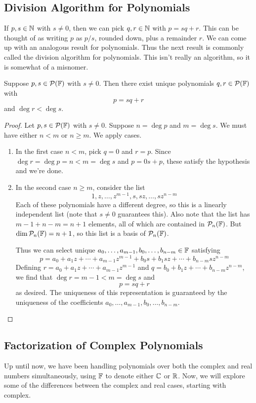 \subsection*{Division Algorithm for Polynomials}
If $p,s\in\mathbb{N}$ with $s\ne 0$, then we can pick $q,r\in\mathbb{N}$ with $p = sq + r$. This can be thought of as writing $p$ as $p/s$, rounded down, plus a remainder $r$. We can come up with an analogous result for polynomials. Thus the next result is commonly called the division algorithm for polynomials. This isn't really an algorithm, so it is somewhat of a misnomer.
\begin{theorem}
    Suppose $p,s\in \mathcal{P}(\mathbb F)$ with $s\ne 0$. Then there exist unique polynomials $q,r\in\mathcal{P}(\mathbb F)$ with
    \[ p = sq + r\]
    and $\deg r < \deg s$.
\end{theorem}
\begin{proof}
    Let $p,s\in\mathcal{P}(\mathbb F)$ with $s\ne 0$. Suppose $n = \deg p$ and $m = \deg s$. We must have either $n < m$ or $n \ge m$. We apply cases.
    \begin{enumerate}
        \item In the first case $n < m$, pick $q = 0$ and $r = p$. Since $\deg r = \deg p = n < m = \deg s$ and $p = 0s + p$, these satisfy the hypothesis and we're done.
        \item In the second case $n \ge m$, consider the list
        \[ 1, z, \dots, z^{m-1}, s, sz, \dots, sz^{n-m}\]
        Each of these polynomials have a different degree, so this is a linearly independent list (note that $s\ne 0$ guarantees this). Also note that the list has $m-1 + n-m = n+1$ elements, all of which are contained in $\mathcal{P}_n(\mathbb F)$. But $\dim \mathcal{P}_n(\mathbb F) = n+1$, so this list is a basis of $\mathcal{P}_n(\mathbb F)$.

        Thus we can select unique $a_0, \dots, a_{m-1}, b_0, \dots, b_{n-m}\in \mathbb F$ satisfying
        \[ p = a_0 + a_1z + \cdots + a_{m-1}z^{m-1} + b_0s + b_1sz + \cdots + b_{n-m}sz^{n-m} \]
        Defining $r = a_0 + a_1z + \cdots + a_{m-1}z^{m-1}$ and $q = b_0 + b_1z + \cdots + b_{n-m}z^{n-m}$, we find that $\deg r = m-1 < m = \deg s$ and
        \[ p = sq + r\]
        as desired. The uniqueness of this representation is guaranteed by the uniqueness of the coefficients $a_0 ,\dots, a_{m-1}, b_0, \dots, b_{n-m}$.
    \end{enumerate}
\end{proof}
\subsection*{Factorization of Complex Polynomials}
Up until now, we have been handling polynomials over both the complex and real numbers simultaneously, using $\mathbb F$ to denote either $\mathbb{C}$ or $\mathbb{R}$. Now, we will explore some of the differences between the complex and real cases, starting with complex.

